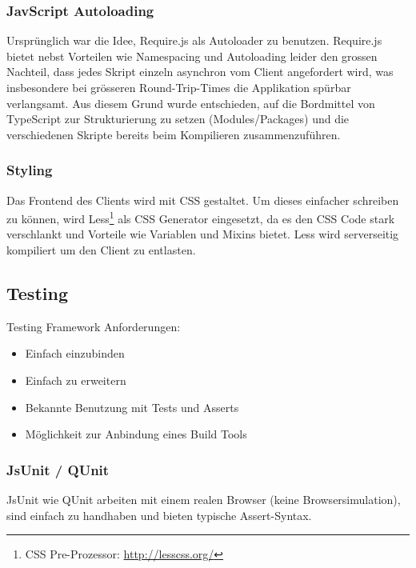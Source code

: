 			
			\subsubsection{JavScript Autoloading}
				Ursprünglich war die Idee, Require.js als Autoloader zu benutzen.
				Require.js bietet nebst Vorteilen wie Namespacing und Autoloading leider den grossen Nachteil,
				dass jedes Skript einzeln asynchron vom Client angefordert wird, 
				was insbesondere bei grösseren Round-Trip-Times die Applikation spürbar verlangsamt.
				Aus diesem Grund wurde entschieden, 
				auf die Bordmittel von TypeScript zur Strukturierung zu setzen (Modules/Packages) 
				und die verschiedenen Skripte bereits beim Kompilieren zusammenzuführen.
				

			\subsubsection{Styling}
				Das Frontend des Clients wird mit CSS gestaltet.
				Um dieses einfacher schreiben zu können,
				wird Less\footnote{CSS Pre-Prozessor: \url{http://lesscss.org/}} als CSS Generator eingesetzt, da es den CSS Code stark verschlankt und Vorteile wie Variablen und Mixins bietet.
				Less wird serverseitig kompiliert um den Client zu entlasten.
				
		\subsection{Testing}
			Testing Framework Anforderungen:
			\begin{itemize}
				\item Einfach einzubinden
				\item Einfach zu erweitern
				\item Bekannte Benutzung mit Tests und Asserts
				\item Möglichkeit zur Anbindung eines Build Tools
			\end{itemize}

			\subsubsection{JsUnit / QUnit} %
				JsUnit wie QUnit arbeiten mit einem realen Browser (keine Browsersimulation), 
				sind einfach zu handhaben und bieten typische Assert-Syntax.
				
				
